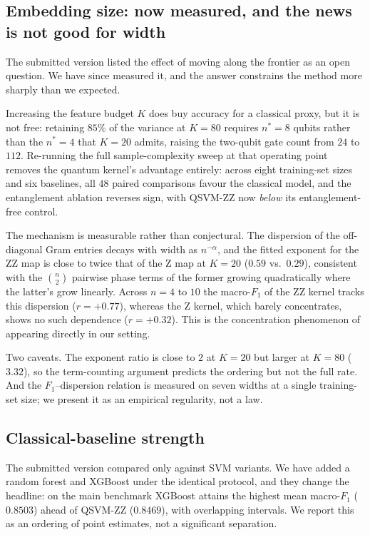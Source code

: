 \subsection{Embedding size: now measured, and the news is not good for width}

The submitted version listed the effect of moving along the frontier as an open
question. We have since measured it, and the answer constrains the method more
sharply than we expected.

Increasing the feature budget $K$ does buy accuracy for a classical proxy, but
it is not free: retaining $85\%$ of the variance at $K=80$ requires $n^\ast=8$
qubits rather than the $n^\ast=4$ that $K=20$ admits, raising the two-qubit gate
count from $24$ to $112$. Re-running the full sample-complexity sweep at that
operating point removes the quantum kernel's advantage entirely: across eight
training-set sizes and six baselines, all $48$ paired comparisons favour the
classical model, and the entanglement ablation reverses sign, with QSVM-ZZ now
\emph{below} its entanglement-free control.

The mechanism is measurable rather than conjectural. The dispersion of the
off-diagonal Gram entries decays with width as $n^{-\alpha}$, and the fitted
exponent for the ZZ map is close to twice that of the Z map at $K=20$
($0.59$ vs.\ $0.29$), consistent with the $\binom{n}{2}$ pairwise phase terms of
the former growing quadratically where the latter's grow linearly. Across
$n=4$ to $10$ the macro-$F_1$ of the ZZ kernel tracks this dispersion
($r=+0.77$), whereas the Z kernel, which barely concentrates, shows no such
dependence ($r=+0.32$). This is the concentration phenomenon of
\cite{thanasilp2024} appearing directly in our setting.

Two caveats. The exponent ratio is close to $2$ at $K=20$ but larger at $K=80$
($3.32$), so the term-counting argument predicts the ordering but not the full
rate. And the $F_1$--dispersion relation is measured on seven widths at a single
training-set size; we present it as an empirical regularity, not a law.

\subsection{Classical-baseline strength}

The submitted version compared only against SVM variants. We have added a
random forest and XGBoost under the identical protocol, and they change the
headline: on the main benchmark XGBoost attains the highest mean macro-$F_1$
($0.8503$) ahead of QSVM-ZZ ($0.8469$), with overlapping intervals. We report
this as an ordering of point estimates, not a significant separation.

